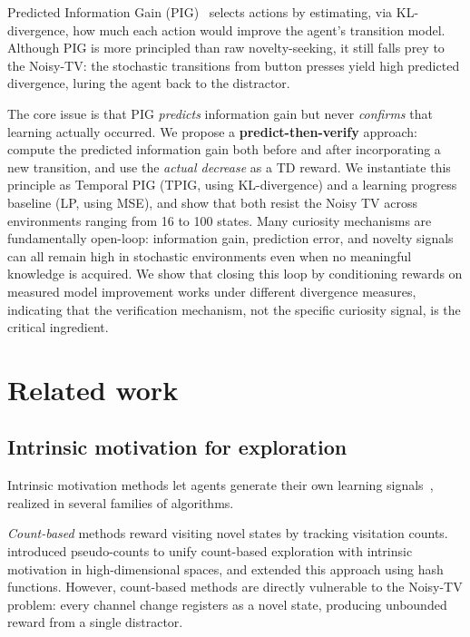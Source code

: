 \documentclass[letterpaper]{article}
\begin{document}
Predicted Information Gain
(PIG)~\citep{10.3389/fncir.2013.00037} selects actions by estimating,
via KL-divergence, how much each action would improve the agent's
transition model.  Although PIG is more principled than raw
novelty-seeking, it still falls prey to the Noisy-TV: the stochastic
transitions from button presses yield high predicted divergence, luring
the agent back to the distractor.

The core issue is that PIG \emph{predicts} information gain but never
\emph{confirms} that learning actually occurred.  We propose a
\textbf{predict-then-verify} approach: compute the predicted
information gain both before and after incorporating a new transition,
and use the \emph{actual decrease} as a TD reward.  We instantiate
this principle as Temporal PIG (TPIG, using KL-divergence) and a
learning progress baseline (LP, using MSE), and show that both resist
the Noisy TV across environments ranging from 16 to 100 states.
Many curiosity mechanisms are fundamentally open-loop: information
gain, prediction error, and novelty signals can all remain high in
stochastic environments even when no meaningful knowledge is acquired.
We show that closing this loop by conditioning rewards on measured
model improvement works under different divergence measures,
indicating that the verification mechanism, not the specific curiosity
signal, is the critical ingredient.

\section{Related work}

\subsection{Intrinsic motivation for exploration}

Intrinsic motivation methods let agents generate their own learning
signals~\citep{DBLP:journals/corr/abs-1908-06976,FToCFaIM:Jurgen},
realized in several families of algorithms.

\emph{Count-based} methods reward visiting novel states by tracking
visitation counts.  \citet{Bellemare2016counting} introduced
pseudo-counts to unify count-based exploration with intrinsic
motivation in high-dimensional spaces, and
\citet{DBLP:journals/corr/TangHFSCDSTA16} extended this approach
using hash functions.  However, count-based methods are directly
vulnerable to the Noisy-TV problem: every channel change registers
as a novel state, producing unbounded reward from a single
distractor.
\end{document}
